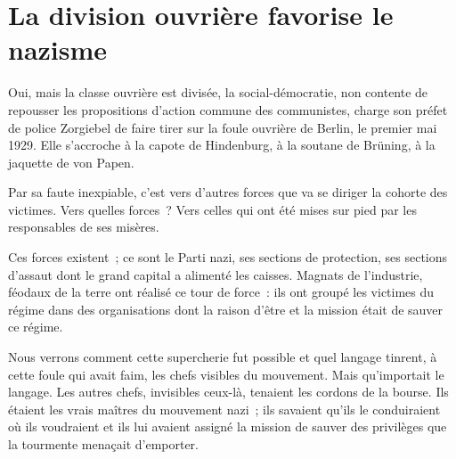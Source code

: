 \documentclass[french,twoside]{book} %
\begin{document}
\section[{La division ouvrière favorise le nazisme}]{La division ouvrière favorise le nazisme}
\noindent Oui, mais la classe ouvrière est divisée, la social-démocratie, non contente de repousser les propositions d’action commune des communistes, charge son préfet de police Zorgiebel de faire tirer sur la foule ouvrière de Berlin, le premier mai 1929. Elle s’accroche à la capote de Hindenburg, à la soutane de Brüning, à la jaquette de von Papen.\par
Par sa faute inexpiable, c’est vers d’autres forces que va se diriger la cohorte des victimes. Vers quelles forces ? Vers celles qui ont été mises sur pied par les responsables de ses misères.\par
Ces forces existent ; ce sont le Parti nazi, ses sections de protection, ses sections d’assaut dont le grand capital a alimenté les caisses. Magnats de l’industrie, féodaux de la terre ont réalisé ce tour de force : ils ont groupé les victimes du régime dans des organisations dont la raison d’être et la mission était de sauver ce régime.\par
Nous verrons comment cette supercherie fut possible et quel langage tinrent, à cette foule qui avait faim, les chefs visibles du mouvement. Mais qu’importait le langage. Les autres chefs, invisibles ceux-là, tenaient les cordons de la bourse. Ils étaient les vrais maîtres du mouvement nazi ; ils savaient qu’ils le conduiraient où ils voudraient et ils lui avaient assigné la mission de sauver des privilèges que la tourmente menaçait d’emporter.
\end{document}
